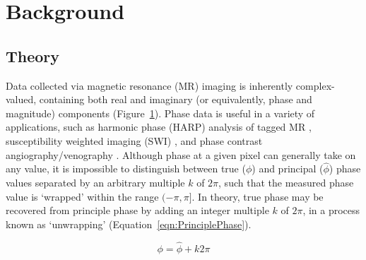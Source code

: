 \section{Background}

\subsection{Theory}

Data collected via magnetic resonance (MR) imaging is inherently complex-valued, containing both real and imaginary (or equivalently, phase and magnitude) components (Figure~\ref{fig:Complex_Plane}).  Phase data is useful in a variety of applications, such as harmonic phase (HARP) analysis of tagged MR \cite{Osman1999}, susceptibility weighted imaging (SWI) \cite{Li2011}, and phase contrast angiography/venography .  Although phase at a given pixel can generally take on any value, it is impossible to distinguish between true ($\phi$) and principal ($\hat{\phi}$) phase values separated by an arbitrary multiple $k$ of $2\pi$, such that the measured phase value is `wrapped' within the range $(-\pi, \pi]$.  In theory, true phase may be recovered from principle phase by adding an integer multiple $k$ of $2\pi$, in a process known as `unwrapping' (Equation~\ref{eqn:PrinciplePhase}).

\begin{equation}
\label{eqn:PrinciplePhase}
\phi = \hat{ \phi } + k2\pi
\end{equation}

\begin{figure}[h] %
\center
{}
\label{fig:Complex_Plane}
\end{figure}

